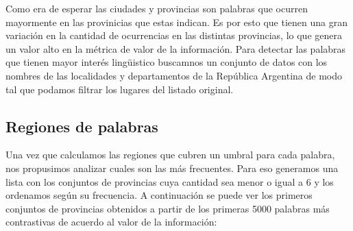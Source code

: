 Como era de esperar las ciudades y provincias son palabras que ocurren mayormente en las provinicias que estas indican. Es por esto que tienen una gran variación en 
la cantidad de ocurrencias en las distintas provincias, lo que genera un valor alto en la métrica de valor de la información. Para detectar las palabras que tienen 
mayor interés lingüistico buscamnos un conjunto de datos con los nombres de las localidades y departamentos de la República Argentina de modo tal que podamos filtrar 
los lugares del listado original.


\subsection{Regiones de palabras} %
\label{sub:regiones_de_palabras}

Una vez que calculamos las regiones que cubren un umbral para cada palabra, nos propusimos analizar cuales son las más frecuentes. Para eso generamos una lista con los conjuntos de provincias cuya cantidad sea menor o igual a 6 y los ordenamos según su frecuencia. A continuación se puede ver los primeros conjuntos de provincias obtenidos a partir de los primeras 5000 palabras más contrastivas de acuerdo al valor de la información:

